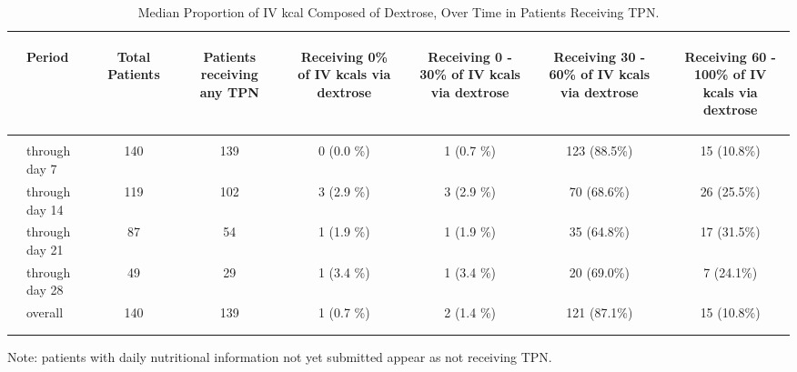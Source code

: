 \documentclass[dvips, 10pt]{article}
\begin{document}
\begin{table}[t]
\caption
{ Median Proportion of IV kcal Composed of Dextrose, Over Time in Patients Receiving TPN. }
\begin{center}
\begin{tabular}{ @{}l@{}
@{}l@{}@{}p{1.5em}@{}@{}c@{}@{}p{1.5em}@{}@{}c@{}@{}p{1.5em}@{}@{}c@{}@{}p{1.5em}@{}@{}c@{}@{}p{1.5em}@{}@{}c@{}@{}p{1.5em}@{}@{}c@{}
}
\hline

& \parbox{6em}{\begin{center}Period\end{center}} && \parbox{6em}{\begin{center}Total Patients\end{center}} && \parbox{6em}{\begin{center}Patients receiving any TPN\end{center}} && \parbox{6em}{\begin{center}Receiving 0\% of IV kcals via dextrose\end{center}} && \parbox{6em}{\begin{center}Receiving 0 - 30\% of IV kcals via dextrose\end{center}} && \parbox{6em}{\begin{center}Receiving 30 - 60\% of IV kcals via dextrose\end{center}} && \parbox{6em}{\begin{center}Receiving 60 - 100\% of IV kcals via dextrose\end{center}} \\

\hline

\\
& through day 7 && 140 && 139 && 0 (0.0 \%) && 1 (0.7 \%) && 123 (88.5\%) && 15 (10.8\%) \\
& through day 14 && 119 && 102 && 3 (2.9 \%) && 3 (2.9 \%) && 70 (68.6\%) && 26 (25.5\%) \\
& through day 21 && 87 && 54 && 1 (1.9 \%) && 1 (1.9 \%) && 35 (64.8\%) && 17 (31.5\%) \\
& through day 28 && 49 && 29 && 1 (3.4 \%) && 1 (3.4 \%) && 20 (69.0\%) && 7 (24.1\%) \\
& overall && 140 && 139 && 1 (0.7 \%) && 2 (1.4 \%) && 121 (87.1\%) && 15 (10.8\%) \\
\\
\hline \\

\end{tabular}


\parbox{ 5in }{  Note: patients with daily nutritional information not yet submitted appear as not receiving TPN. } \\
 \vspace{1em}\end{center}
 \end{table}
\end{document}
